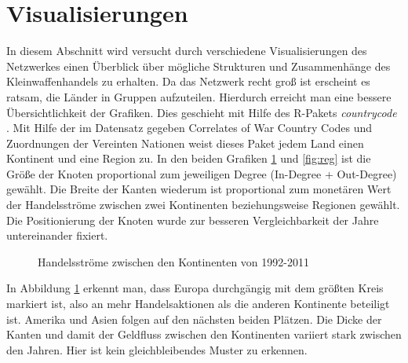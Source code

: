\documentclass[a4paper,ngerman,oneside,titlepage,bibliography=totoc,11pt]{scrreprt}
\begin{document}

\newpage
\section{Visualisierungen}



In diesem Abschnitt wird versucht durch verschiedene Visualisierungen des Netzwerkes einen Überblick über mögliche Strukturen und Zusammenhänge des Kleinwaffenhandels zu erhalten. Da das Netzwerk recht groß ist erscheint es ratsam, die Länder in Gruppen aufzuteilen. Hierdurch erreicht man eine bessere Übersichtlichkeit der Grafiken. Dies geschieht mit Hilfe des R-Pakets \emph{countrycode} \citep{countrycode}. Mit Hilfe der im Datensatz gegeben Correlates of War Country Codes und Zuordnungen der Vereinten Nationen weist dieses Paket jedem Land einen Kontinent und eine Region zu. In den beiden Grafiken \ref{fig:cont} und \ref{fig:reg} ist die Größe der Knoten proportional zum jeweiligen Degree (In-Degree + Out-Degree) gewählt. Die Breite der Kanten wiederum ist proportional zum monetären Wert der Handelsströme zwischen zwei Kontinenten beziehungsweise Regionen gewählt. Die Positionierung der Knoten wurde zur besseren Vergleichbarkeit der Jahre untereinander fixiert.

\begin{figure}[ht]
\centering
{}
\caption{Handelsströme zwischen den Kontinenten von 1992-2011}
\label{fig:cont}
\end{figure}

In Abbildung \ref{fig:cont} erkennt man, dass Europa durchgängig mit dem größten Kreis markiert ist, also an mehr Handelsaktionen als die anderen Kontinente beteiligt ist. Amerika und Asien folgen auf den nächsten beiden Plätzen. Die Dicke der Kanten und damit der Geldfluss zwischen den Kontinenten variiert stark zwischen den Jahren. Hier ist kein gleichbleibendes Muster zu erkennen.
\end{document}

